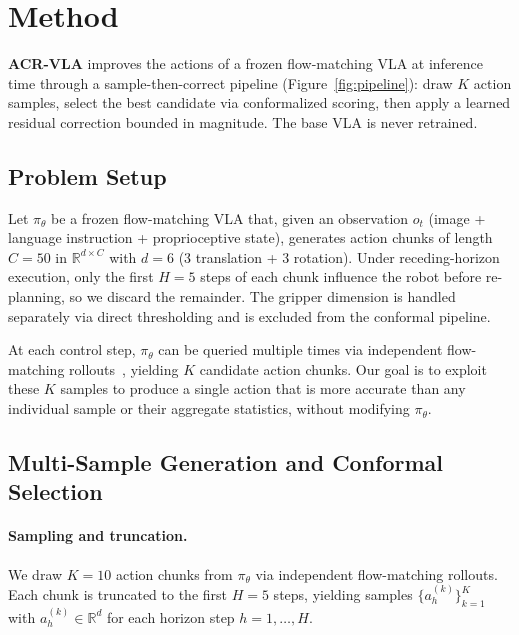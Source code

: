 
\section{Method}
\label{sec:method}

\textbf{ACR-VLA} improves the actions of a frozen flow-matching VLA at inference time through a sample-then-correct pipeline (Figure~\ref{fig:pipeline}): draw $K$ action samples, select the best candidate via conformalized scoring, then apply a learned residual correction bounded in magnitude. The base VLA is never retrained.

\subsection{Problem Setup}
\label{sec:problem_setup}

Let $\pi_\theta$ be a frozen flow-matching VLA that, given an observation $o_t$ (image + language instruction + proprioceptive state), generates action chunks of length $C{=}50$ in $\mathbb{R}^{d \times C}$ with $d{=}6$ (3 translation + 3 rotation). Under receding-horizon execution, only the first $H{=}5$ steps of each chunk influence the robot before re-planning, so we discard the remainder. The gripper dimension is handled separately via direct thresholding and is excluded from the conformal pipeline.

At each control step, $\pi_\theta$ can be queried multiple times via independent flow-matching rollouts~\cite{lipman2023flow}, yielding $K$ candidate action chunks. Our goal is to exploit these $K$ samples to produce a single action that is more accurate than any individual sample or their aggregate statistics, without modifying $\pi_\theta$.

\subsection{Multi-Sample Generation and Conformal Selection}
\label{sec:selection}

\paragraph{Sampling and truncation.}
We draw $K{=}10$ action chunks from $\pi_\theta$ via independent flow-matching rollouts. Each chunk is truncated to the first $H{=}5$ steps, yielding samples $\{a_h^{(k)}\}_{k=1}^K$ with $a_h^{(k)} \in \mathbb{R}^d$ for each horizon step $h = 1, \dots, H$.

